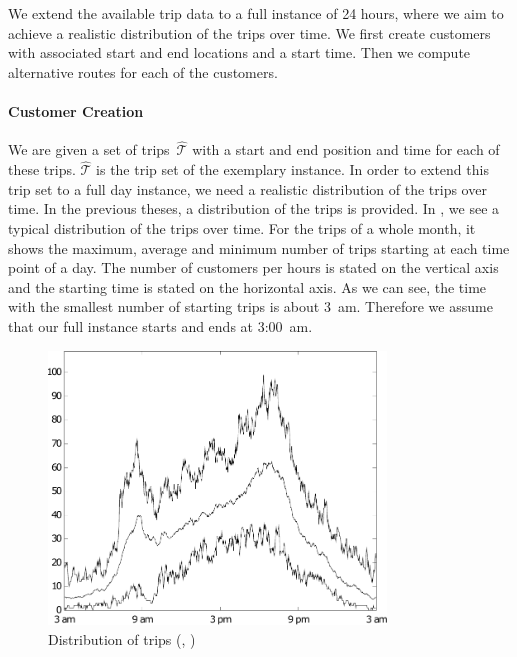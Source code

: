 We extend the available trip data to a full instance of 24 hours, where we aim to achieve a realistic distribution of the trips over time. We first create customers with associated start and end locations and a start time. Then we compute alternative routes for each of the customers.

\paragraph{Customer Creation} \parfill

We are given a set of trips~$\widehat{\mathcal{T}}$ with a start and end position and time for each of these trips. $\widehat{\mathcal{T}}$ is the trip set of the exemplary instance. In order to extend this trip set to a full day instance, we need a realistic distribution of the trips over time. In the previous theses, a distribution of the trips is provided. In , we see a typical distribution of the trips over time. For the trips of a whole month, it shows the maximum, average and minimum number of trips starting at each time point of a day. The number of customers per hours is stated on the vertical axis and the starting time is stated on the horizontal axis. As we can see, the time with the smallest number of starting trips is about 3~am. Therefore we assume that our full instance starts and ends at 3:00~am.

\begin{figure}[htb]
	\centering
	\includegraphics[width=0.8\textwidth]{graphic/Trip_Distribution}
	\caption{Distribution of trips (\cite[p.~62]{Kaiser}, \cite[p.~62]{Knoll})}
	\label{fig:trip_distribution}
\end{figure}


